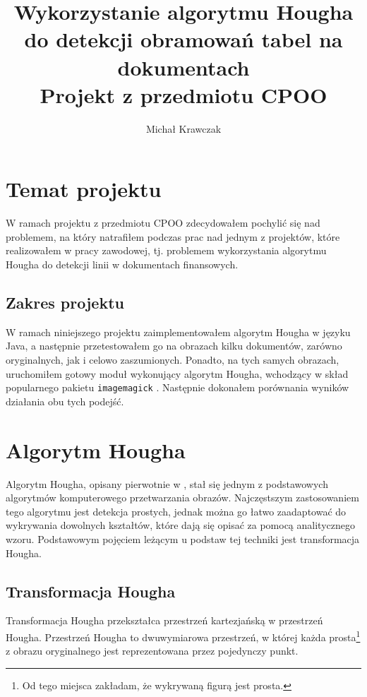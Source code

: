 \documentclass[10pt]{article} %
\begin{document}
\title{%
  Wykorzystanie algorytmu Hougha do detekcji obramowań tabel na dokumentach \\[0.6\baselineskip]
  \large Projekt z przedmiotu CPOO}
\author{Michał Krawczak}

\maketitle

\tableofcontents

\newpage

\section{Temat projektu}

W ramach projektu z przedmiotu CPOO zdecydowałem pochylić się nad problemem, na który natrafiłem podczas prac nad jednym z projektów, które realizowałem w pracy zawodowej, tj. problemem wykorzystania algorytmu Hougha do detekcji linii w dokumentach finansowych. 

\subsection{Zakres projektu}

W ramach niniejszego projektu zaimplementowałem algorytm Hougha w języku Java, a następnie przetestowałem go na obrazach kilku dokumentów, zarówno oryginalnych, jak i celowo zaszumionych. Ponadto, na tych samych obrazach, uruchomiłem gotowy moduł wykonujący algorytm Hougha, wchodzący w skład popularnego pakietu \texttt{imagemagick} \cite{imagemagick}. Następnie dokonałem porównania wyników działania obu tych podejść. 

\section{Algorytm Hougha}

Algorytm Hougha, opisany pierwotnie w \cite{hough}, stał się jednym z podstawowych algorytmów komputerowego przetwarzania obrazów. Najczęstszym zastosowaniem tego algorytmu jest detekcja prostych, jednak można go łatwo zaadaptować do wykrywania dowolnych kształtów, które dają się opisać za pomocą analitycznego wzoru\cite{duda}. Podstawowym pojęciem leżącym u podstaw tej techniki jest transformacja Hougha.

\subsection{Transformacja Hougha}
Transformacja Hougha przekształca przestrzeń kartezjańską w przestrzeń Hougha. Przestrzeń Hougha to dwuwymiarowa przestrzeń, w której każda prosta\footnote{Od tego miejsca zakładam, że wykrywaną figurą jest prosta.} z obrazu oryginalnego jest reprezentowana przez pojedynczy punkt. 
\end{document}
